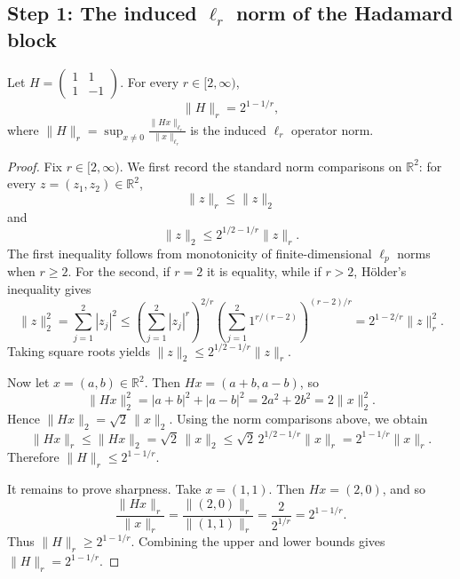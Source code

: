 \subsection*{Step 1: The induced $\ell_r$ norm of the Hadamard block}

\begin{lemma}\label{lem:hadamard-norm}
Let $H = \begin{pmatrix} 1 & 1 \\ 1 & -1 \end{pmatrix}$. For every $r \in [2,\infty)$,
\[
\|H\|_r = 2^{1-1/r},
\]
where $\|H\|_r = \sup_{x \neq 0} \frac{\|Hx\|_{\ell_r}}{\|x\|_{\ell_r}}$ is the induced $\ell_r$ operator norm.
\end{lemma}

\begin{proof}
Fix $r \in [2,\infty)$. We first record the standard norm comparisons on $\mathbb{R}^2$: for every $z=(z_1,z_2)\in\mathbb{R}^2$,
\[
\|z\|_r \le \|z\|_2
\]
and
\[
\|z\|_2 \le 2^{1/2-1/r}\|z\|_r.
\]
The first inequality follows from monotonicity of finite-dimensional $\ell_p$ norms when $r\ge 2$. For the second, if $r=2$ it is equality, while if $r>2$, H\"older's inequality gives
\[
\|z\|_2^2
=\sum_{j=1}^2 |z_j|^2
\le \left(\sum_{j=1}^2 |z_j|^r\right)^{2/r}
\left(\sum_{j=1}^2 1^{r/(r-2)}\right)^{(r-2)/r}
=2^{1-2/r}\|z\|_r^2.
\]
Taking square roots yields $\|z\|_2 \le 2^{1/2-1/r}\|z\|_r$.

Now let $x=(a,b)\in\mathbb{R}^2$. Then $Hx=(a+b,a-b)$, so
\[
\|Hx\|_2^2 = |a+b|^2+|a-b|^2 = 2a^2+2b^2 = 2\|x\|_2^2.
\]
Hence $\|Hx\|_2=\sqrt{2}\,\|x\|_2$. Using the norm comparisons above, we obtain
\[
\|Hx\|_r \le \|Hx\|_2 = \sqrt{2}\,\|x\|_2 \le \sqrt{2}\,2^{1/2-1/r}\|x\|_r = 2^{1-1/r}\|x\|_r.
\]
Therefore $\|H\|_r\le 2^{1-1/r}$.

It remains to prove sharpness. Take $x=(1,1)$. Then $Hx=(2,0)$, and so
\[
\frac{\|Hx\|_r}{\|x\|_r} = \frac{\|(2,0)\|_r}{\|(1,1)\|_r} = \frac{2}{2^{1/r}} = 2^{1-1/r}.
\]
Thus $\|H\|_r\ge 2^{1-1/r}$. Combining the upper and lower bounds gives $\|H\|_r=2^{1-1/r}$.
\end{proof}
